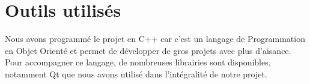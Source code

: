 \section{Outils utilisés}

Nous avons programmé le projet en C++ car c'est un langage de Programmation en Objet Orienté et permet de développer de gros projets avec plus d'aisance. \\

Pour accompagner ce langage, de nombreuses librairies sont disponibles, notamment Qt que nous avons utilisé dans l'intégralité de notre projet.


\newpage


\newpage


\newpage


\newpage


\newpage